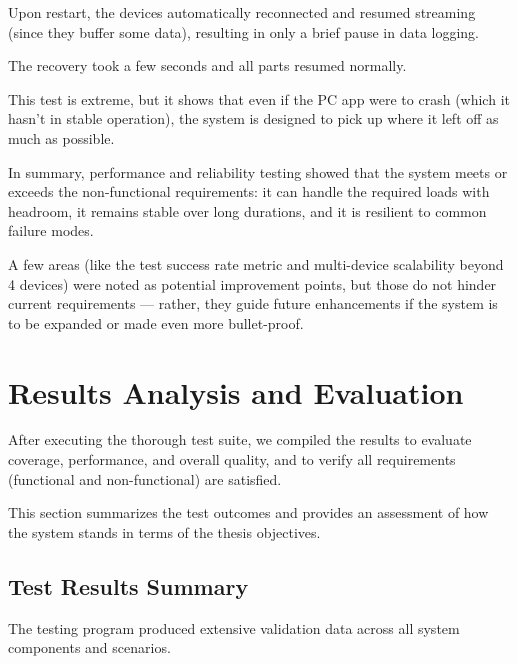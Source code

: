 {{{Upon restart, the devices automatically reconnected and resumed streaming (since they
buffer some data), resulting in only a brief pause in data logging.

The recovery took a few seconds and all parts resumed normally.

This test is extreme, but it shows that even if the PC app were to crash (which it
hasn't in stable operation), the system is designed to pick up where it left off as
much as possible.

In summary, performance and reliability testing showed that the system meets or
exceeds the non-functional requirements: it can handle the required loads with
headroom, it remains stable over long durations, and it is resilient to common
failure modes.

A few areas (like the test success rate metric and multi-device scalability beyond 4
devices) were noted as potential improvement points, but those do not hinder current
requirements --- rather, they guide future enhancements if the system is to be
expanded or made even more bullet-proof.

\section{Results Analysis and Evaluation}

After executing the thorough test suite, we compiled the results to evaluate
coverage, performance, and overall quality, and to verify all requirements
(functional and non-functional) are satisfied.

This section summarizes the test outcomes and provides an assessment of how the
system stands in terms of the thesis objectives.

\subsection{Test Results Summary}

The testing program produced extensive validation data across all system components
and scenarios.

}}}
